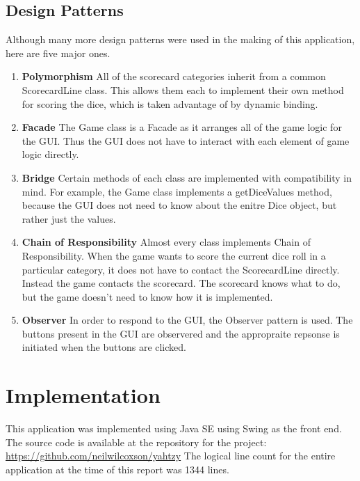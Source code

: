 \documentclass[12pt]{article}
\begin{document}
\subsection*{Design Patterns}
Although many more design patterns were used in the making of this application, here are five major ones.

\begin{enumerate}
\item \textbf{Polymorphism} \newline
All of the scorecard categories inherit from a common ScorecardLine class.  This allows them each to implement their own method for scoring the dice, which is taken advantage of by dynamic binding.
\item \textbf{Facade}\newline
The Game class is a Facade as it arranges all of the game logic for the GUI.  Thus the GUI does not have to interact with each element of game logic directly.
\item \textbf{Bridge}\newline
Certain methods of each class are implemented with compatibility in mind.  For example, the Game class implements a getDiceValues method, because the GUI does not need to know about the enitre Dice object, but rather just the values.

\item \textbf{Chain of Responsibility}\newline
Almost every class implements Chain of Responsibility.  When the game wants to score the current dice roll in a particular category, it does not have to contact the ScorecardLine directly.  Instead the game contacts the scorecard.  The scorecard knows what to do, but the game doesn't need to know how it is implemented.
\item \textbf{Observer}\newline
In order to respond to the GUI, the Observer pattern is used.  The buttons present in the GUI are observered and the appropraite repsonse is initiated when the buttons are clicked.
\end{enumerate}

\section*{Implementation}
This application was implemented using Java SE using Swing as the front end.  The source code is available at the repository for the project:\newline
\url{https://github.com/neilwilcoxson/yahtzy}\newline\newline
\noindent The logical line count for the entire application at the time of this report was 1344 lines.
\end{document}

